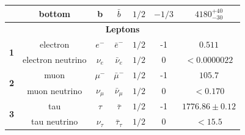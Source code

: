 \begin{table}[h!]
\begin{tabular}{|ccccccc|}
    \multicolumn{1}{|c|}{}                            & \multicolumn{1}{c|}{bottom}            & \multicolumn{1}{c|}{b}               & \multicolumn{1}{c|}{$\bar{b}$}             & \multicolumn{1}{c|}{$1/2$} & \multicolumn{1}{c|}{$-1/3$}  & $4180_{-30}^{+40}$                             \\ \hline
    \multicolumn{7}{|c|}{\textbf{Leptons}}                                                                                                                                                                                                                                                                               \\ \hline
    \multicolumn{1}{|c|}{\multirow{2}{*}{\textbf{1}}}                & \multicolumn{1}{c|}{electron}          & \multicolumn{1}{c|}{$e^-$}           & \multicolumn{1}{c|}{$\bar{e}^-$}           & \multicolumn{1}{c|}{$1/2$} & \multicolumn{1}{c|}{-1}              & $0.511$                                        \\ \cline{2-7} 
    \multicolumn{1}{|c|}{}                   & \multicolumn{1}{c|}{electron neutrino} & \multicolumn{1}{c|}{$\nu_{e}$}       & \multicolumn{1}{c|}{$\bar{\nu}_e$}         & \multicolumn{1}{c|}{$1/2$} & \multicolumn{1}{c|}{0}               & $<0.0000022$                                   \\ \hline
    \multicolumn{1}{|c|}{\multirow{2}{*}{\textbf{2}}} & \multicolumn{1}{c|}{muon}              & \multicolumn{1}{c|}{$\mu^-$}         & \multicolumn{1}{c|}{$\bar{\mu}^-$}         & \multicolumn{1}{c|}{$1/2$} & \multicolumn{1}{c|}{-1}              & $105.7$                                        \\ \cline{2-7} 
    \multicolumn{1}{|c|}{}                            & \multicolumn{1}{c|}{muon neutrino}     & \multicolumn{1}{c|}{$\nu_{\mu}$}     & \multicolumn{1}{c|}{$\bar{\nu}_{\mu}$}     & \multicolumn{1}{c|}{$1/2$} & \multicolumn{1}{c|}{0}               & $<0.170$                                       \\ \hline
    \multicolumn{1}{|c|}{\multirow{2}{*}{\textbf{3}}} & \multicolumn{1}{c|}{tau}               & \multicolumn{1}{c|}{$\tau$}          & \multicolumn{1}{c|}{$\bar{\tau}$}          & \multicolumn{1}{c|}{$1/2$} & \multicolumn{1}{c|}{-1}              & $1776.86 \pm 0.12$                             \\ \cline{2-7} 
    \multicolumn{1}{|c|}{}                            & \multicolumn{1}{c|}{tau neutrino}      & \multicolumn{1}{c|}{$\nu_{\tau}$}    & \multicolumn{1}{c|}{$\bar{\tau}_{\tau}$}   & \multicolumn{1}{c|}{$1/2$} & \multicolumn{1}{c|}{0}               & $< 15.5$                                       \\ \hline
    \end{tabular}
    \end{table}

